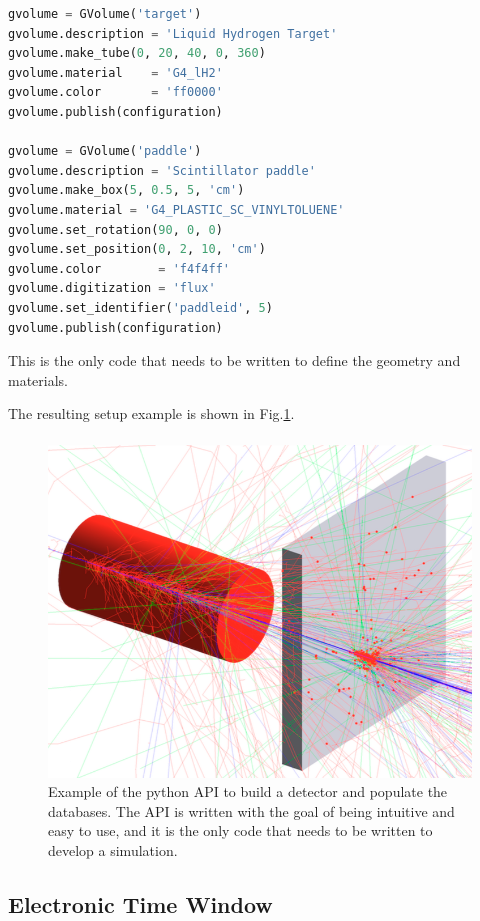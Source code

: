 \begin{lstlisting}[language=Python]
gvolume = GVolume('target')
gvolume.description = 'Liquid Hydrogen Target'
gvolume.make_tube(0, 20, 40, 0, 360)
gvolume.material    = 'G4_lH2'
gvolume.color       = 'ff0000'
gvolume.publish(configuration)

gvolume = GVolume('paddle')
gvolume.description = 'Scintillator paddle'
gvolume.make_box(5, 0.5, 5, 'cm')
gvolume.material = 'G4_PLASTIC_SC_VINYLTOLUENE'
gvolume.set_rotation(90, 0, 0)
gvolume.set_position(0, 2, 10, 'cm')
gvolume.color        = 'f4f4ff'
gvolume.digitization = 'flux'
gvolume.set_identifier('paddleid', 5)
gvolume.publish(configuration)
\end{lstlisting}

This is the only code that needs to be written to define the geometry and materials.

The resulting setup example is shown in Fig.\ref{fig:api}.

\begin{figure}[h]
    \centering
    \includegraphics[width=.95\textwidth]{img/api}
    \caption{Example of the python API to build a detector and populate the databases.
        The API is written with the goal of being intuitive and easy to use,
        and it is the only code that needs to be written to  develop a simulation.}
    \label{fig:api}
\end{figure}


\subsection{Electronic Time Window}
\label{subsec:time_window}


